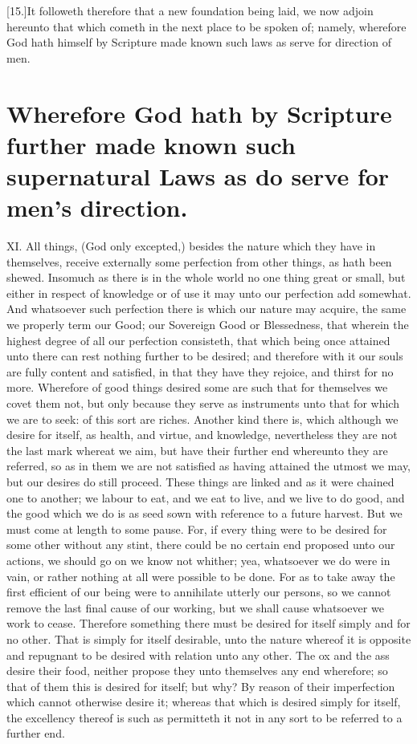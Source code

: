 [15.]It followeth therefore that a new foundation being laid, we now adjoin hereunto that which cometh in the next place to be spoken of; namely, wherefore God hath himself by Scripture made known such laws as serve for direction of men.

\section*{Wherefore God hath by Scripture further made known such supernatural Laws as do serve for men’s direction.}

XI. All things, (God only excepted,) besides the nature which they have in themselves, receive externally some perfection from other things, as hath been shewed. Insomuch as there is in the whole world no one thing great or small, but either in respect of knowledge or of use it may unto our perfection add somewhat. And whatsoever such perfection there is which our nature may acquire, the same we properly term our Good; our Sovereign Good or Blessedness, that wherein the highest degree of all our perfection consisteth, that which being once attained unto there can rest nothing further to be desired; and therefore with it our souls are fully content and satisfied, in that they have they rejoice, and thirst for no more. Wherefore of good things desired some are such that for themselves we covet them not, but only because they serve as instruments unto that for which we are  to seek: of this sort are riches. Another kind there is, which although we desire for itself, as health, and virtue, and knowledge, nevertheless they are not the last mark whereat we aim, but have their further end whereunto they are referred, so as in them we are not satisfied as having attained the utmost we may, but our desires do still proceed. These things are linked and as it were chained one to another; we labour to eat, and we eat to live, and we live to do good, and the good which we do is as seed sown with reference to a future harvest. But we must come at length to some pause. For, if every thing were to be desired for some other without any stint, there could be no certain end proposed unto our actions, we should go on we know not whither; yea, whatsoever we do were in vain, or rather nothing at all were possible to be done. For as to take away the first efficient of our being were to annihilate utterly our persons, so we cannot remove the last final cause of our working, but we shall cause whatsoever we work to cease. Therefore something there must be desired for itself simply and for no other. That is simply for itself desirable, unto the nature whereof it is opposite and repugnant to be desired with relation unto any other. The ox and the ass desire their food, neither propose they unto themselves any end wherefore; so that of them this is desired for itself; but why? By reason of their imperfection which cannot otherwise desire it; whereas that which is desired simply for itself, the excellency thereof is such as permitteth it not in any sort to be referred to a further end.

